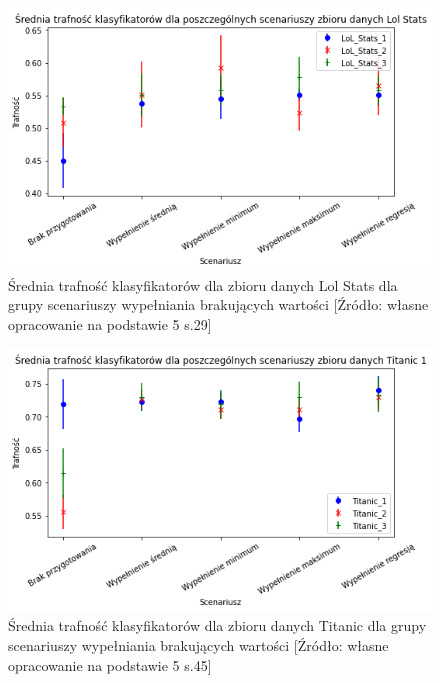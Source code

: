 \documentclass[oneside]{book}
\begin{document}
\begin{figure}[H]
    \centerline{\includegraphics[scale=0.8]{Lol_Stats_Avg_Wypełnienie_brakujących}}
    \centering
    \caption{Średnia trafność klasyfikatorów dla zbioru danych Lol Stats 
    dla grupy scenariuszy wypełniania brakujących wartości
    [Źródło: własne opracowanie na podstawie 5 s.29]}
    \end{figure}

\begin{figure}[H]
    \centerline{\includegraphics[scale=0.8]{Titanic_Avg_Wypełnienie_brakujących}}
    \centering
    \caption{Średnia trafność klasyfikatorów dla zbioru danych Titanic 
    dla grupy scenariuszy wypełniania brakujących wartości
    [Źródło: własne opracowanie na podstawie 5 s.45]}
    \end{figure}
\end{document}
